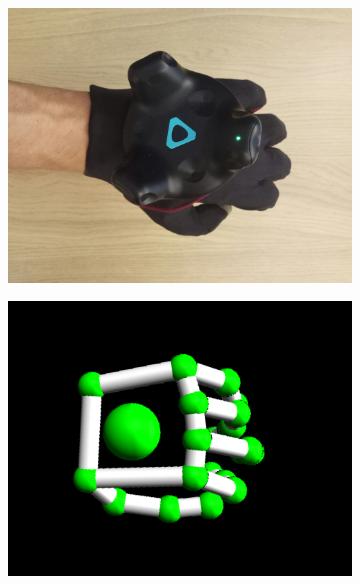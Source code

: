 \documentclass[hyperref, bachelorofscience]{cgvpub}
\begin{document}
\begin{figure}
\begin{subfigure}{.235\linewidth}
		\includegraphics[width=\linewidth]{../pics/hand_dorsal_nat}
	\end{subfigure}
	\hspace{.01cm}
	\begin{subfigure}{.235\linewidth}
		\includegraphics[width=\linewidth]{../pics/model_dorsal_nat}
	\end{subfigure}
	\begin{subfigure}{.235\linewidth}

\end{subfigure}
\end{figure}
\end{document}

